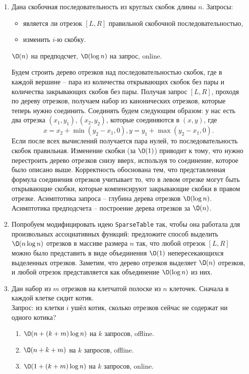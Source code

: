 \begin{enumerate}
  \item
	Дана скобочная последовательность из круглых скобок длины $n$. Запросы:
	\begin{itemize}
	    \item является ли отрезок $[L, R]$ правильной скобочной последовательностью,
	    \item изменить $i$-ю скобку.
	\end{itemize}
	$\O(n)$ на предподсчет, $\O(\log n)$ на запрос, online.
	\begin{solution}
		Будем строить дерево отрезков над последовательностью скобок, где в каждой вершине -- пара из количества открывающих скобок без пары и количества закрывающих скобов без пары. Получая запрос $[L, R]$, проходя по дереву отрезков, получаем набор из канонических отрезков, которые теперь нужно соединить. Соединять будем следующим образом: у нас есть два отрезка $(x_1, y_1), (x_2, y_2)$, которые соединяются в $(x, y)$, где $$x = x_2 + \min (y_2 - x_1, 0), y = y_1 + \max (y_2 - x_1, 0).$$ Если после всех вычислений получается пара нулей, то последовательность скобок правильная. Изменение скобки (за $\O(1)$) приводит к тому, что нужно перестроить дерево отрезков снизу вверх, используя то соединение, которое было описано выше. Корректность обоснована тем, что представленная формула соединения отрезков учитывает то, что в левом отрезке могут быть открывающие скобки, которые компенсируют закрывающие скобки в правом отрезке. Асимптотика запроса -- глубина дерева отрезков $\O(\log n)$. Асимптотика предподсчета -- построение дерева отрезков за $\O(n)$.
	\end{solution}

  \item
	Попробуем модифицировать идею \texttt{SparseTable} так, чтобы она работала для произвольных ассоциативных функций:
	предложите способ выделить $\O(n \log n)$ отрезков в массиве размера $n$ так, что любой
	отрезок $[L, R]$ можно было представить в виде объединения $\O(1)$ непересекающихся выделенных отрезков. 
	Заметим, что дерево отрезков выделяет $\O(n)$ отрезков, и любой отрезок
	представляется как объединение $\O(\log n)$ из них.

  \item
	Дан набор из $m$ отрезков на клетчатой полоске из $n$ клеточек. Сначала в каждой клетке сидит котик.\\
	Запрос: из клетки $i$ ушёл котик, сколько отрезков сейчас не содержат ни одного котика?

    \begin{enumerate}
      \item $\O(n + (k + m)\log{n})$ на $k$ запросов, offline.
      \item $\O(n + k + m)$ на $k$ запросов, offline.
      \item {} $\O(1 + (k + m)\log{n})$ на $k$ запросов, online.
    \end{enumerate}



\end{enumerate}
